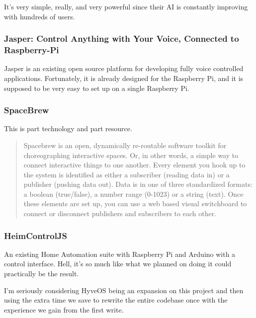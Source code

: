 \begin{multicols}{2}
			It's very simple, really, and very powerful since their AI is constantly improving with hundreds of users.
		
		\subsubsection{Jasper: Control Anything with Your Voice, Connected to Raspberry-Pi}
		
			Jasper is an existing open source platform for developing fully voice controlled applications.
			Fortunately, it is already designed for the Raspberry Pi, and it is supposed to be very easy to set up on a single Raspberry Pi.
			
		\subsubsection{SpaceBrew}
		
			This is part technology and part resource.
			
			\begin{quote}
				Spacebrew is an open, dynamically re-routable software toolkit for choreographing interactive spaces. Or, in other words, a simple way to connect interactive things to one another. Every element you hook up to the system is identified as either a subscriber (reading data in) or a publisher (pushing data out). Data is in one of three standardized formats: a boolean (true/false), a number range (0-1023) or a string (text). Once these elements are set up, you can use a web based visual switchboard to connect or disconnect publishers and subscribers to each other.
			\end{quote}
			
		\subsubsection{HeimControlJS}
		
			An existing Home Automation suite with Raspberry Pi and Arduino with a control interface.
			Hell, it's so much like what we planned on doing it could practically be the result.
			
			I'm seriously considering HyveOS being an expansion on this project and then using the extra time we save to rewrite the entire codebase once with the experience we gain from the first write.
			

\end{multicols}
